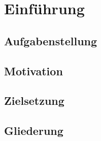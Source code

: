\chapter{Einführung}

\section{Aufgabenstellung}

\section{Motivation}

\section{Zielsetzung}

\section{Gliederung}